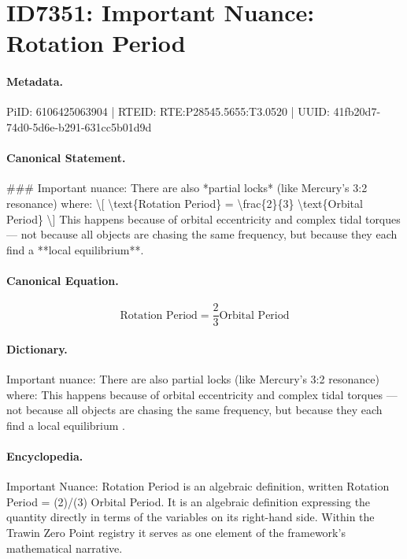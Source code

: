 \section*{ID7351: Important Nuance: Rotation Period}
\paragraph{Metadata.}
PiID: 6106425063904 | RTEID: RTE:P28545.5655:T3.0520 | UUID: 41fb20d7-74d0-5d6e-b291-631cc5b01d9d

\paragraph{Canonical Statement.}
\#\#\# Important nuance: There are also *partial locks* (like Mercury’s 3:2 resonance) where: \textbackslash{}[ \textbackslash{}text\{Rotation Period\} = \textbackslash{}frac\{2\}\{3\} \textbackslash{}text\{Orbital Period\} \textbackslash{}] This happens because of orbital eccentricity and complex tidal torques — not because all objects are chasing the same frequency, but because they each find a **local equilibrium**.

\paragraph{Canonical Equation.}
\[
\text{Rotation Period} = \frac{2}{3} \text{Orbital Period}
\]

\paragraph{Dictionary.}
Important nuance: There are also partial locks (like Mercury’s 3:2 resonance) where: This happens because of orbital eccentricity and complex tidal torques — not because all objects are chasing the same frequency, but because they each find a local equilibrium .

\paragraph{Encyclopedia.}
Important Nuance: Rotation Period is an algebraic definition, written Rotation Period = (2)/(3) Orbital Period. It is an algebraic definition expressing the quantity directly in terms of the variables on its right-hand side. Within the Trawin Zero Point registry it serves as one element of the framework's mathematical narrative.
